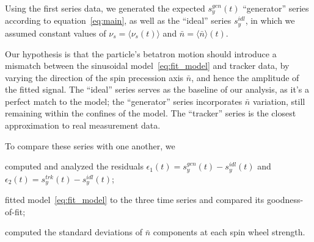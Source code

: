 \documentclass[a4paper]{jacow}
\newcommand{\avg}[1]{\langle {#1} \rangle}
\newcommand{\nbar}{\bar n}
\begin{document}

Using the first series data, we generated the expected $s_y^{gen}(t)$ ``generator'' series according to
equation~\eqref{eq:main}, as well as the ``ideal'' series $s_y^{idl}$, in which
we assumed constant values of $\nu_s = \avg{\nu_s(t)}$ and $\nbar
=\avg{\nbar}(t)$. 

Our hypothesis is that the particle's betatron
motion should introduce a mismatch between the sinusoidal
model~\eqref{eq:fit_model} and tracker data, by varying the direction
of the spin precession axis $\nbar$, and hence the amplitude of the
fitted signal. The ``ideal'' series serves as the baseline of our
analysis, as it's a perfect match to the model; the ``generator''
series incorporates $\nbar$ variation, still remaining within the confines of
the model. The ``tracker'' series is the closest approximation to
real measurement data.

To compare these series with one another, we
\begin{inparaenum}
\item computed and analyzed the residuals $\epsilon_1(t) = s_y^{gen}(t) -
s_y^{idl}(t)$ and $\epsilon_2(t) = s_y^{trk}(t) - s_y^{idl}(t)$;
\item fitted model~\eqref{eq:fit_model} to the three time series and
  compared its goodness-of-fit;
\item computed the standard deviations of $\nbar$ components at each
  spin wheel strength.
\end{inparaenum}
\end{document}
